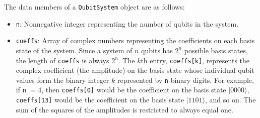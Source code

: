 \documentclass{article}
\begin{document}
The data members of a \verb~QubitSystem~ object are as follows: 
\begin{itemize}
\item \verb~n~: Nonnegative integer representing the number of qubits in the system. 
\item \verb~coeffs~: Array of complex numbers representing the coefficients on each basis state of the system. Since a system of $n$ qubits has $2^n$ possible basis states, the length of \verb~coeffs~ is always $2^n$. The $k$th entry, \verb~coeffs[k]~, represents the complex coefficient (the amplitude) on the basis state whose individual qubit values form the binary integer $k$ represented by \verb~n~ binary digits. For example, if \verb~n~ $= 4$, then \verb~coeffs[0]~ would be the coefficient on the basis state $|0000\rangle$, \verb~coeffs[13]~ would be the coefficient on the basis state $|1101\rangle$, and so on. The sum of the squares of the amplitudes is restricted to always equal one. 
\end{itemize}
\end{document}
